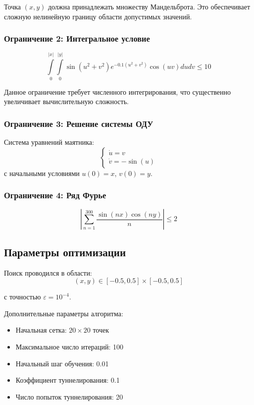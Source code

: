 \documentclass[12pt]{article}
\begin{document}
Точка $(x,y)$ должна принадлежать множеству Мандельброта. Это обеспечивает сложную нелинейную границу области допустимых значений.

\subsubsection{Ограничение 2: Интегральное условие}
\begin{equation}
\int\limits_{0}^{|x|}\int\limits_{0}^{|y|} \sin(u^2 + v^2)e^{-0.1(u^2 + v^2)}\cos(uv)dudv \leq 10
\end{equation}

Данное ограничение требует численного интегрирования, что существенно увеличивает вычислительную сложность.

\subsubsection{Ограничение 3: Решение системы ОДУ}
Система уравнений маятника:
\begin{equation}
\begin{cases}
\dot{u} = v \\
\dot{v} = -\sin(u)
\end{cases}
\end{equation}
с начальными условиями $u(0)=x$, $v(0)=y$.

\subsubsection{Ограничение 4: Ряд Фурье}
\begin{equation}
\left|\sum_{n=1}^{300} \frac{\sin(nx)\cos(ny)}{n}\right| \leq 2
\end{equation}

\subsection{Параметры оптимизации}

Поиск проводился в области:
\begin{equation}
(x,y) \in [-0.5, 0.5] \times [-0.5, 0.5]
\end{equation}

с точностью $\varepsilon = 10^{-4}$. 

Дополнительные параметры алгоритма:
\begin{itemize}
    \item Начальная сетка: $20 \times 20$ точек
    \item Максимальное число итераций: 100
    \item Начальный шаг обучения: 0.01
    \item Коэффициент туннелирования: 0.1
    \item Число попыток туннелирования: 20
\end{itemize}
\end{document}
